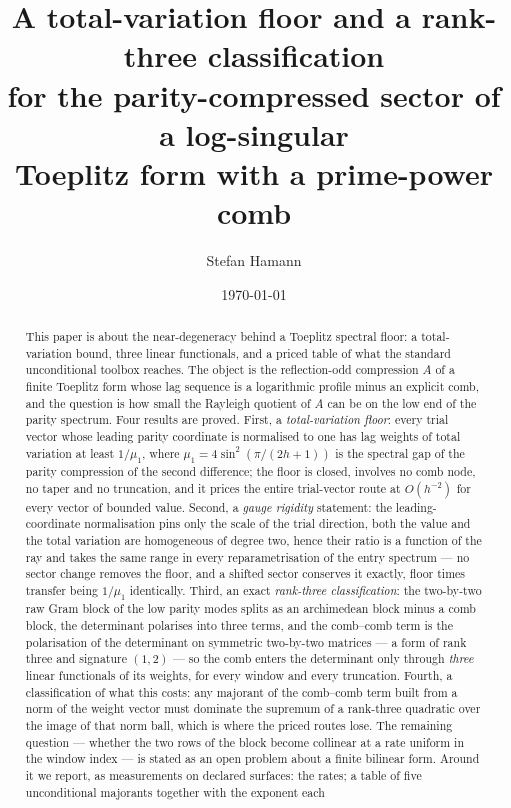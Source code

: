 \documentclass[11pt,a4paper]{article}
\title{A total-variation floor and a rank-three classification\\
for the parity-compressed sector of a log-singular\\
Toeplitz form with a prime-power comb}
\author{Stefan Hamann}
\date{\today}
\theoremstyle{plain}
\theoremstyle{definition}
\begin{document}
\maketitle

\begin{abstract}
\noindent
This paper is about the near-degeneracy behind a Toeplitz spectral floor: a
total-variation bound, three linear functionals, and a priced table of what the
standard unconditional toolbox reaches. The object is the reflection-odd
compression $A$ of a finite Toeplitz form whose lag sequence is a logarithmic
profile minus an explicit comb, and the question is how small the Rayleigh
quotient of $A$ can be on the low end of the parity spectrum. Four results are
proved. First, a \emph{total-variation floor}: every trial vector whose leading
parity coordinate is normalised to one has lag weights of total variation at
least $1/\mu_1$, where $\mu_1=4\sin^2(\pi/(2h+1))$ is the spectral gap of the
parity compression of the second difference; the floor is closed, involves no
comb node, no taper and no truncation, and it prices the entire trial-vector
route at $O(h^{-2})$ for every vector of bounded value. Second, a \emph{gauge
rigidity} statement: the leading-coordinate normalisation pins only the scale of
the trial direction, both the value and the total variation are homogeneous of
degree two, hence their ratio is a function of the ray and takes the same range
in every reparametrisation of the entry spectrum --- no sector change removes
the floor, and a shifted sector conserves it exactly, floor times transfer
being $1/\mu_1$ identically. Third, an exact \emph{rank-three classification}:
the two-by-two raw Gram block of the low parity modes splits as an archimedean
block minus a comb block, the determinant polarises into three terms, and the
comb--comb term is the polarisation of the determinant on symmetric
two-by-two matrices --- a form of rank three and signature $(1,2)$ --- so the
comb enters the determinant only through \emph{three} linear functionals of its
weights, for every window and every truncation. Fourth, a classification of
what this costs: any majorant of the comb--comb term built from a norm of the
weight vector must dominate the supremum of a rank-three quadratic over the
image of that norm ball, which is where the priced routes lose. The remaining
question --- whether the two rows of the block become collinear at a rate
uniform in the window index --- is stated as an open problem about a finite
bilinear form. Around it we report, as measurements on declared surfaces: the
rates; a table of five unconditional majorants together with the exponent each

\end{abstract}
\end{document}
